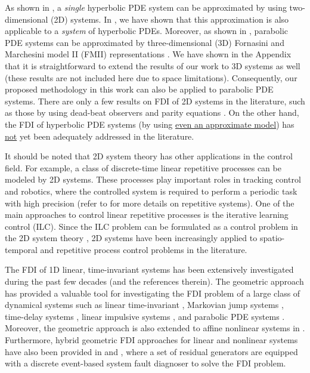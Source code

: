 \documentclass[journal,12pt,draftcls,onecolumn]{IEEEtran}
\begin{document}
As shown in \cite{HyperPDE_2D}, a {\it single} hyperbolic PDE system can be approximated by using two-dimensional (2D) systems. In \cite{ACC2013}, we have shown that this approximation is also applicable to a {\it system} of hyperbolic PDEs. Moreover, as shown in \cite{Parabolic3D}, parabolic PDE systems can be approximated by three-dimensional (3D) Fornasini and Marchesini model II (FMII)  representations \cite{Kaczorek_Book, 2DRef, Stability2D2013, FMinBook}. We have shown in the Appendix that it is straightforward to extend the results of our work to 3D systems as well (these results are not included here due to space limitations). Consequently, our proposed methodology in this work can also be applied to parabolic PDE systems. There are only a few results on FDI of 2D systems in the literature, such as those by using dead-beat observers \cite{BisiaccoMultiDim} and parity equations \cite{FMResidual, BisiaccoLetter}. On the other hand, the FDI of hyperbolic PDE systems (by using \underline{even an approximate model}) has \underline{not} yet been adequately addressed in the literature.

It should be noted that 2D system theory has other applications in the control field. For example, a class of discrete-time linear repetitive processes can be modeled by  2D systems. These  processes play important roles in tracking control and robotics, where the controlled system is required to perform a periodic task with  high precision (refer to \cite{RepitativeProcess_Book} for more details on repetitive systems). One of the main approaches to control linear repetitive processes is the iterative learning control (ILC)\cite{RepitativeProcess_Book}. Since the ILC problem can be formulated as a control problem in the 2D system theory \cite{ILC_2D_Tac}, 2D systems have been increasingly applied to spatio-temporal and repetitive process control problems in the literature.


The FDI of 1D linear, time-invariant systems has been extensively investigated during the past few decades \cite{IsermannBook2006} (and the references therein). The geometric approach \cite{Mass_Thesis, Massoumnia1986,  Massoumnia1989} has provided a valuable tool for investigating the FDI problem of a large class of dynamical systems such as linear time-invariant \cite{Massoumnia1989}, Markovian jump systems \cite{DrMeskin_TacFullPaper}, time-delay systems \cite{DrMeskin_Delay}, linear impulsive systems \cite{DrMeskin_Impulsive}, and parabolic PDE  systems \cite{ACC2012}. Moreover, the geometric approach is also extended to affine nonlinear systems in \cite{IsidoriFDI}.  Furthermore, hybrid geometric FDI approaches for linear and nonlinear systems have also been provided in \cite{MKR_SysTech2010} and \cite{MKR_Nonlin2010}, where a set of residual generators are equipped with a discrete event-based system fault diagnoser to solve the FDI problem.
\end{document}
